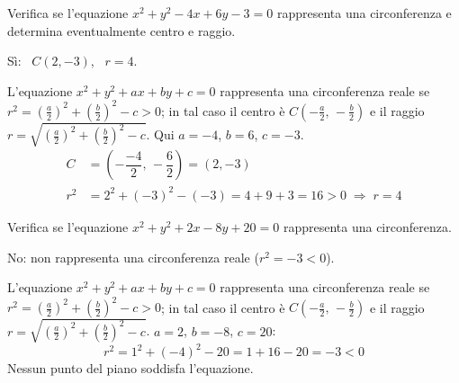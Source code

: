 \begin{question}[ID=1.1, subtitle={Verifica della circonferenza $x^2+y^2-4x+6y-3=0$}, difficulty=facile, tags={circonferenza}]
Verifica se l'equazione $x^2+y^2-4x+6y-3=0$ rappresenta una circonferenza e determina eventualmente centro e raggio.
\begin{solution}
Sì: \ $C(2,-3)$, \ $r=4$.
\end{solution}
\begin{explanation}
L'equazione $x^2+y^2+ax+by+c=0$ rappresenta una circonferenza reale se $r^2=\left(\tfrac a2\right)^2+\left(\tfrac b2\right)^2-c>0$; in tal caso il centro è $C\left(-\tfrac a2,\,-\tfrac b2\right)$ e il raggio $r=\sqrt{\left(\tfrac a2\right)^2+\left(\tfrac b2\right)^2-c}$.
Qui $a=-4$, $b=6$, $c=-3$.
\[\begin{aligned}
C &= \left(-\dfrac{-4}{2},\,-\dfrac62\right)=(2,-3)\\
r^2 &= 2^2+(-3)^2-(-3)=4+9+3=16>0 \;\Rightarrow\; r=4
\end{aligned}\]
\end{explanation}
\end{question}


\begin{question}[ID=1.2, subtitle={Verifica di una circonferenza non reale}, difficulty=facile, tags={circonferenza}]
Verifica se l'equazione $x^2+y^2+2x-8y+20=0$ rappresenta una circonferenza.
\begin{solution}
No: non rappresenta una circonferenza reale ($r^2=-3<0$).
\end{solution}
\begin{explanation}
L'equazione $x^2+y^2+ax+by+c=0$ rappresenta una circonferenza reale se $r^2=\left(\tfrac a2\right)^2+\left(\tfrac b2\right)^2-c>0$; in tal caso il centro è $C\left(-\tfrac a2,\,-\tfrac b2\right)$ e il raggio $r=\sqrt{\left(\tfrac a2\right)^2+\left(\tfrac b2\right)^2-c}$.
$a=2$, $b=-8$, $c=20$:
\[ r^2=1^2+(-4)^2-20=1+16-20=-3<0 \]
Nessun punto del piano soddisfa l'equazione.
\end{explanation}
\end{question}



